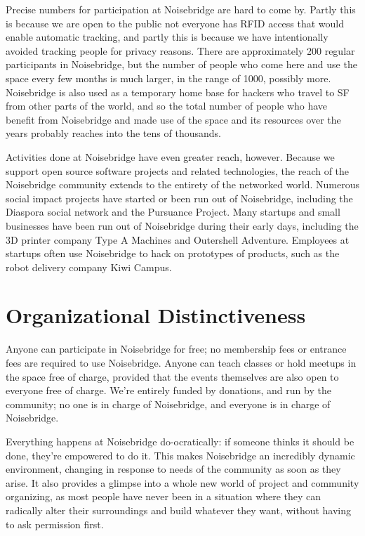 \documentclass[12pt]{article}
\begin{document}
Precise numbers for participation at Noisebridge are hard to come by. Partly this is because we are open to the public not everyone has RFID access that would enable automatic tracking, and partly this is because we have intentionally avoided tracking people for privacy reasons. There are approximately 200 regular participants in Noisebridge, but the number of people who come here and use the space every few months is much larger, in the range of 1000, possibly more. Noisebridge is also used as a temporary home base for hackers who travel to SF from other parts of the world, and so the total number of people who have benefit from Noisebridge and made use of the space and its resources over the years probably reaches into the tens of thousands.

Activities done at Noisebridge have even greater reach, however. Because we support open source software projects and related technologies, the reach of the Noisebridge community extends to the entirety of the networked world. Numerous social impact projects have started or been run out of Noisebridge, including the Diaspora social network and the Pursuance Project. Many startups and small businesses have been run out of Noisebridge during their early days, including the 3D printer company Type A Machines and Outershell Adventure. Employees at startups often use Noisebridge to hack on prototypes of products, such as the robot delivery company Kiwi Campus.





\section{Organizational Distinctiveness}

Anyone can participate in Noisebridge for free; no membership fees or entrance fees are required to use Noisebridge. Anyone can teach classes or hold meetups in the space free of charge, provided that the events themselves are also open to everyone free of charge. We're entirely funded by donations, and run by the community; no one is in charge of Noisebridge, and everyone is in charge of Noisebridge.

Everything happens at Noisebridge do-ocratically: if someone thinks it should be done, they're empowered to do it. This makes Noisebridge an incredibly dynamic environment, changing in response to needs of the community as soon as they arise. It also provides a glimpse into a whole new world of project and community organizing, as most people have never been in a situation where they can radically alter their surroundings and build whatever they want, without having to ask permission first.
\end{document}
